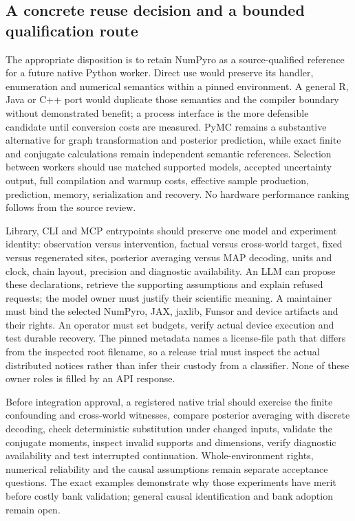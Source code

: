 \subsection{A concrete reuse decision and a bounded qualification route}

The appropriate disposition is to retain NumPyro as a source-qualified reference for a future native Python worker. Direct use would preserve its handler, enumeration and numerical semantics within a pinned environment. A general R, Java or C++ port would duplicate those semantics and the compiler boundary without demonstrated benefit; a process interface is the more defensible candidate until conversion costs are measured. PyMC remains a substantive alternative for graph transformation and posterior prediction, while exact finite and conjugate calculations remain independent semantic references. Selection between workers should use matched supported models, accepted uncertainty output, full compilation and warmup costs, effective sample production, prediction, memory, serialization and recovery. No hardware performance ranking follows from the source review. \cite{exec23_numpyro_sources,exec23_pymc_sources,exec23_numpyro_reference}

Library, CLI and MCP entrypoints should preserve one model and experiment identity: observation versus intervention, factual versus cross-world target, fixed versus regenerated sites, posterior averaging versus MAP decoding, units and clock, chain layout, precision and diagnostic availability. An LLM can propose these declarations, retrieve the supporting assumptions and explain refused requests; the model owner must justify their scientific meaning. A maintainer must bind the selected NumPyro, JAX, jaxlib, Funsor and device artifacts and their rights. An operator must set budgets, verify actual device execution and test durable recovery. The pinned metadata names a license-file path that differs from the inspected root filename, so a release trial must inspect the actual distributed notices rather than infer their custody from a classifier. None of these owner roles is filled by an API response. \cite{exec23_numpyro_sources}

Before integration approval, a registered native trial should exercise the finite confounding and cross-world witnesses, compare posterior averaging with discrete decoding, check deterministic substitution under changed inputs, validate the conjugate moments, inspect invalid supports and dimensions, verify diagnostic availability and test interrupted continuation. Whole-environment rights, numerical reliability and the causal assumptions remain separate acceptance questions. The exact examples demonstrate why those experiments have merit before costly bank validation; general causal identification and bank adoption remain open. \cite{exec23_numpyro_sources,exec23_numpyro_reference}
